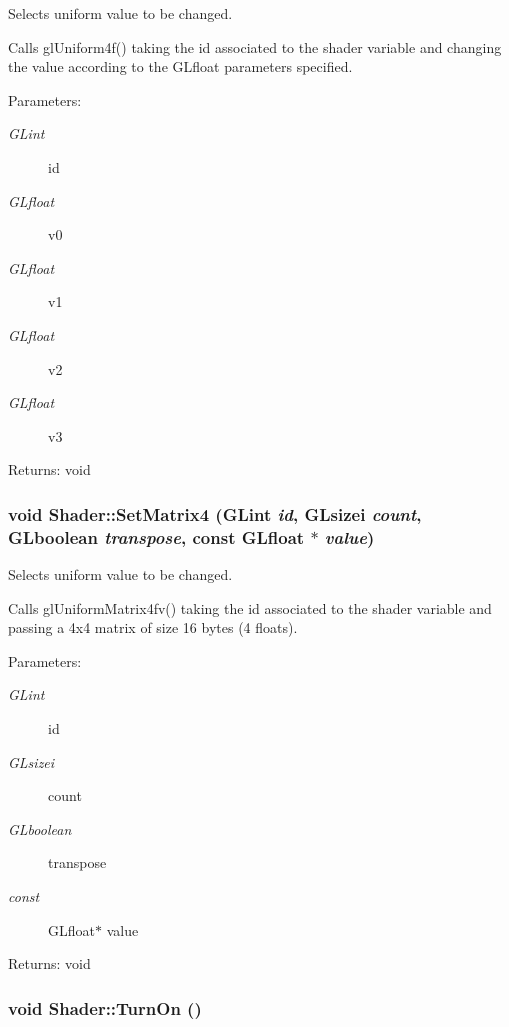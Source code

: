 Selects uniform value to be changed. 

Calls glUniform4f() taking the id associated to the shader variable and changing the value according to the GLfloat parameters specified.

\begin{Desc}
\item[Parameters:]
\begin{description}
\item[{\em GLint}]id \item[{\em GLfloat}]v0 \item[{\em GLfloat}]v1 \item[{\em GLfloat}]v2 \item[{\em GLfloat}]v3 \end{description}
\end{Desc}
\begin{Desc}
\item[Returns:]void \end{Desc}
\hypertarget{class_shader_61b49dc75fb1842ec58845e9912f824d}{
\subsubsection[SetMatrix4]{\setlength{\rightskip}{0pt plus 5cm}void Shader::SetMatrix4 (GLint {\em id}, \/  GLsizei {\em count}, \/  GLboolean {\em transpose}, \/  const GLfloat $\ast$ {\em value})}}
\label{class_shader_61b49dc75fb1842ec58845e9912f824d}


Selects uniform value to be changed. 

Calls glUniformMatrix4fv() taking the id associated to the shader variable and passing a 4x4 matrix of size 16 bytes (4 floats).

\begin{Desc}
\item[Parameters:]
\begin{description}
\item[{\em GLint}]id \item[{\em GLsizei}]count \item[{\em GLboolean}]transpose \item[{\em const}]GLfloat$\ast$ value \end{description}
\end{Desc}
\begin{Desc}
\item[Returns:]void \end{Desc}
\hypertarget{class_shader_01e9b0696a56a5c567ea4b369872c982}{
\subsubsection[TurnOn]{\setlength{\rightskip}{0pt plus 5cm}void Shader::TurnOn ()}}
\label{class_shader_01e9b0696a56a5c567ea4b369872c982}


